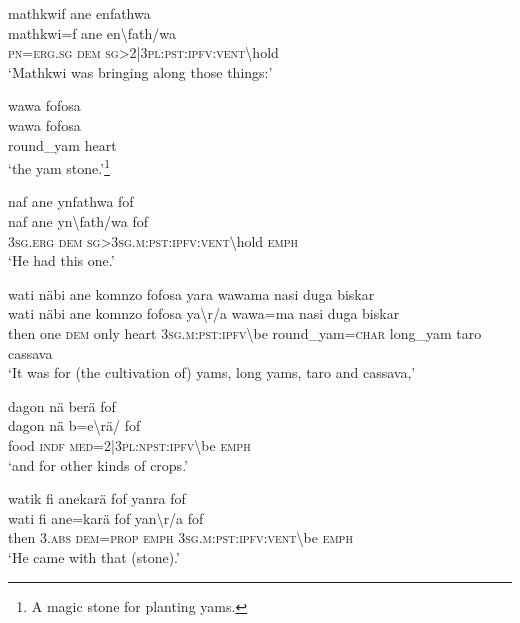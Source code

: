 \ea\label{ex:1:a3657}
mathkwif ane enfathwa\\
\gll mathkwi=f	ane	en{\textbackslash}fath/wa\\
     \textsc{pn}=\textsc{erg}.\textsc{sg}	\textsc{dem}	\textsc{sg}>2|3\textsc{pl}:\textsc{pst}:\textsc{ipfv}:\textsc{vent}{\textbackslash}hold\\
\glt `Mathkwi was bringing along those things:'
\z

\ea\label{ex:1:a3658}
wawa fofosa\\
\gll wawa	fofosa\\
     round\_yam	heart\\
\glt `the yam stone.'\footnote{A magic stone for planting yams.}
\z

\ea\label{ex:1:a3659}
naf ane ynfathwa fof\\
\gll naf	ane	yn{\textbackslash}fath/wa	fof\\
     3\textsc{sg}.\textsc{erg}	\textsc{dem}	\textsc{sg}>3\textsc{sg}.\textsc{m}:\textsc{pst}:\textsc{ipfv}:\textsc{vent}{\textbackslash}hold	\textsc{emph}\\
\glt `He had this one.'
\z

\ea\label{ex:1:a3660}
wati näbi ane komnzo fofosa yara wawama nasi duga biskar\\
\gll wati	näbi	ane	komnzo	fofosa	ya{\textbackslash}r/a	wawa=ma	nasi	duga	biskar\\
     then	one	\textsc{dem}	only	heart	3\textsc{sg}.\textsc{m}:\textsc{pst}:\textsc{ipfv}{\textbackslash}be	round\_yam=\textsc{char}	long\_yam	taro	cassava\\
\glt `It was for (the cultivation of) yams, long yams, taro and cassava,'
\z

\ea\label{ex:1:a3664}
dagon nä berä fof\\
\gll dagon	nä	b=e{\textbackslash}rä/	fof\\
     food	\textsc{indf}	\textsc{med}=2|3\textsc{pl}:\textsc{npst}:\textsc{ipfv}{\textbackslash}be	\textsc{emph}\\
\glt `and for other kinds of crops.'
\z

\ea\label{ex:1:a3665}
watik fi anekarä fof yanra fof\\
\gll wati	fi	ane=karä	fof	yan{\textbackslash}r/a	fof\\
     then	3.\textsc{abs}	\textsc{dem}=\textsc{prop}	\textsc{emph}	3\textsc{sg}.\textsc{m}:\textsc{pst}:\textsc{ipfv}:\textsc{vent}{\textbackslash}be	\textsc{emph}\\
\glt `He came with that (stone).'
\z

